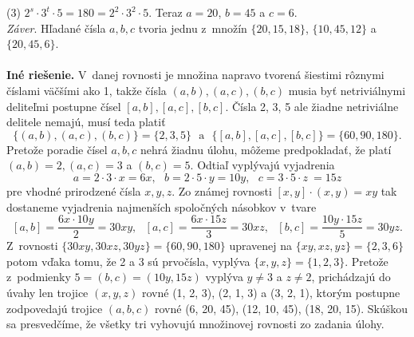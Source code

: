 {(3) $2^s \cdot 3^t \cdot 5 = 180 = 2^2 \cdot 3^2 \cdot 5$. Teraz $a = 20$, $b = 45$ a $c = 6$.\\
\textit{Záver}. Hľadané čísla $a, b, c$ tvoria jednu z~množín $\{20, 15, 18\}$, $\{10, 45, 12\}$ a $\{20, 45, 6\}$.\\
\\
\textbf{Iné riešenie.} V~danej rovnosti je množina napravo tvorená šiestimi rôznymi číslami väčšími ako 1, takže čísla $(a, b), (a, c), (b, c)$ musia byť netriviálnymi deliteľmi postupne čísel $[a, b], [a, c], [b, c]$. Čísla 2, 3, 5 ale žiadne netriviálne delitele nemajú, musí teda platiť
$$\{(a, b), (a, c), (b, c)\}= \{2, 3, 5\} \ \ \ \text{a} \ \ \  \{[a, b], [a, c], [b, c]\} = \{60, 90, 180\}.$$
Pretože poradie čísel $a, b, c$ nehrá žiadnu úlohu, môžeme predpokladať, že platí $(a, b) = 2, (a, c) = 3$ a $(b, c) = 5$. Odtiaľ vyplývajú vyjadrenia
$$a = 2 \cdot 3 \cdot x = 6x, \ \ \ b = 2 \cdot 5 \cdot y = 10y, \ \ \ c = 3 \cdot 5 \cdot z~= 15z$$
pre vhodné prirodzené čísla $x, y, z$. Zo známej rovnosti $[x, y]\cdot(x, y) = xy$ tak dostaneme vyjadrenia najmenších spoločných násobkov v~tvare
$$[a, b] =\frac{6x \cdot 10y}{2}= 30xy, \ \ \ [a, c] =\frac{6x \cdot 15z}{3}= 30xz,\ \ \  [b, c] =\frac{10y \cdot 15z}{5}= 30yz.$$
Z~rovnosti $\{30xy, 30xz, 30yz\} = \{60, 90, 180\}$ upravenej na $\{xy, xz, yz\} = \{2, 3, 6\}$ potom vďaka tomu, že 2 a 3 sú prvočísla, vyplýva $\{x, y, z\} = \{1, 2, 3\}$. Pretože z~podmienky $5 = (b, c) = (10y, 15z)$ vyplýva $y \neq 3$ a $z \neq 2$, prichádzajú do úvahy len trojice $(x, y, z)$ rovné (1, 2, 3), (2, 1, 3) a (3, 2, 1), ktorým postupne zodpovedajú trojice $(a, b, c)$ rovné (6, 20, 45), (12, 10, 45), (18, 20, 15). Skúškou sa presvedčíme, že všetky tri vyhovujú množinovej rovnosti zo zadania úlohy.\\
\\
}
